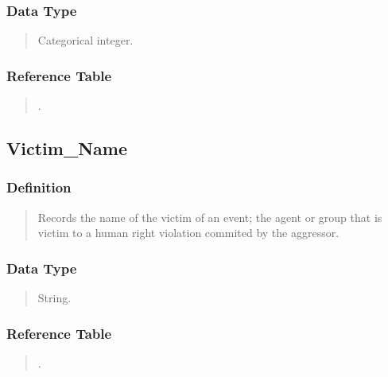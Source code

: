 \documentclass[letterpaper,10pt,english]{sphinxmanual}
\begin{document}
\subsubsection{Data Type}
\label{\detokenize{database_schema:id9}}\begin{quote}

\sphinxAtStartPar
Categorical integer.
\end{quote}


\subsubsection{Reference Table}
\label{\detokenize{database_schema:id10}}\begin{quote}

\sphinxAtStartPar
{\hyperref[\detokenize{database_schema:victim-table}]{}}.
\end{quote}


\subsection{Victim\_Name}
\label{\detokenize{database_schema:victim-name}}

\subsubsection{Definition}
\label{\detokenize{database_schema:id11}}\begin{quote}

\sphinxAtStartPar
Records the name of the victim of an event; the agent or group that is victim to a human right violation commited by the aggressor.
\end{quote}


\subsubsection{Data Type}
\label{\detokenize{database_schema:id12}}\begin{quote}

\sphinxAtStartPar
String.
\end{quote}


\subsubsection{Reference Table}
\label{\detokenize{database_schema:id13}}\begin{quote}

\sphinxAtStartPar
{\hyperref[\detokenize{database_schema:victim-table}]{}}.
\end{quote}
\end{document}
